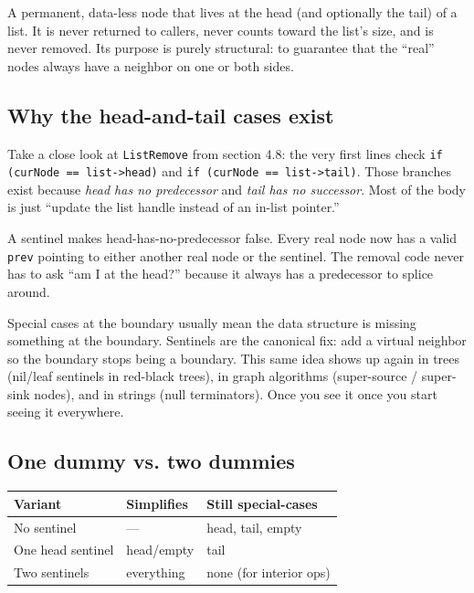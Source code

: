 \documentclass[11pt]{article}
\begin{document}
\begin{defnbox}
A permanent, data-less node that lives at the head (and optionally
the tail) of a list. It is never returned to callers, never counts
toward the list's size, and is never removed. Its purpose is
purely structural: to guarantee that the ``real'' nodes always
have a neighbor on one or both sides.
\end{defnbox}

\subsection*{Why the head-and-tail cases exist}

Take a close look at \texttt{ListRemove} from section 4.8: the
very first lines check \texttt{if (curNode == list->head)} and
\texttt{if (curNode == list->tail)}. Those branches exist because
\emph{head has no predecessor} and \emph{tail has no successor}.
Most of the body is just ``update the list handle instead of an
in-list pointer.''

A sentinel makes head-has-no-predecessor false. Every real node
now has a valid \texttt{prev} pointing to either another real
node or the sentinel. The removal code never has to ask ``am I at
the head?'' because it always has a predecessor to splice around.

\begin{ideabox}
Special cases at the boundary usually mean the data structure is
missing something at the boundary. Sentinels are the canonical
fix: add a virtual neighbor so the boundary stops being a
boundary. This same idea shows up again in trees (nil/leaf
sentinels in red-black trees), in graph algorithms (super-source
/ super-sink nodes), and in strings (null terminators). Once you
see it once you start seeing it everywhere.
\end{ideabox}

\subsection*{One dummy vs. two dummies}

\begin{center}
\begin{tabular}{|l|l|l|}
\hline
\textbf{Variant} & \textbf{Simplifies} & \textbf{Still special-cases} \\
\hline
No sentinel        & ---          & head, tail, empty \\
One head sentinel  & head/empty   & tail \\
Two sentinels      & everything   & none (for interior ops) \\
\hline
\end{tabular}
\end{center}
\end{document}
